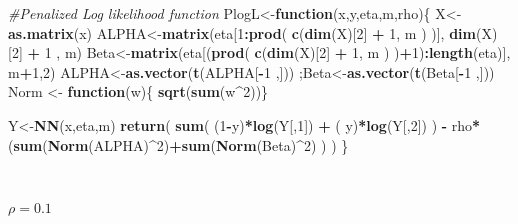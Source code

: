 \documentclass[]{article}
\newenvironment{Shaded}{\begin{snugshade}}{\end{snugshade}}
\newcommand{\KeywordTok}[1]{\textcolor[rgb]{0.13,0.29,0.53}{\textbf{#1}}}
\newcommand{\DecValTok}[1]{\textcolor[rgb]{0.00,0.00,0.81}{#1}}
\newcommand{\StringTok}[1]{\textcolor[rgb]{0.31,0.60,0.02}{#1}}
\newcommand{\CommentTok}[1]{\textcolor[rgb]{0.56,0.35,0.01}{\textit{#1}}}
\newcommand{\ControlFlowTok}[1]{\textcolor[rgb]{0.13,0.29,0.53}{\textbf{#1}}}
\newcommand{\OperatorTok}[1]{\textcolor[rgb]{0.81,0.36,0.00}{\textbf{#1}}}
\newcommand{\NormalTok}[1]{#1}
\begin{document}
\begin{Shaded}
\begin{Highlighting}[]
\CommentTok{#Penalized Log likelihood function}
\NormalTok{PlogL<-}\ControlFlowTok{function}\NormalTok{(x,y,eta,m,rho)\{}
\NormalTok{    X<-}\KeywordTok{as.matrix}\NormalTok{(x)}
\NormalTok{    ALPHA<-}\KeywordTok{matrix}\NormalTok{(eta[}\DecValTok{1}\OperatorTok{:}\KeywordTok{prod}\NormalTok{( }\KeywordTok{c}\NormalTok{(}\KeywordTok{dim}\NormalTok{(X)[}\DecValTok{2}\NormalTok{] }\OperatorTok{+}\StringTok{ }\DecValTok{1}\NormalTok{, m ) )], }\KeywordTok{dim}\NormalTok{(X)[}\DecValTok{2}\NormalTok{] }\OperatorTok{+}\StringTok{ }\DecValTok{1}\NormalTok{ , m)}
\NormalTok{    Beta<-}\KeywordTok{matrix}\NormalTok{(eta[(}\KeywordTok{prod}\NormalTok{( }\KeywordTok{c}\NormalTok{(}\KeywordTok{dim}\NormalTok{(X)[}\DecValTok{2}\NormalTok{] }\OperatorTok{+}\StringTok{ }\DecValTok{1}\NormalTok{, m ) )}\OperatorTok{+}\DecValTok{1}\NormalTok{)}\OperatorTok{:}\KeywordTok{length}\NormalTok{(eta)],}
\NormalTok{        m}\OperatorTok{+}\DecValTok{1}\NormalTok{,}\DecValTok{2}\NormalTok{)}
\NormalTok{    ALPHA<-}\KeywordTok{as.vector}\NormalTok{(}\KeywordTok{t}\NormalTok{(ALPHA[}\OperatorTok{-}\DecValTok{1}\NormalTok{ ,])) ;Beta<-}\KeywordTok{as.vector}\NormalTok{(}\KeywordTok{t}\NormalTok{(Beta[}\OperatorTok{-}\DecValTok{1}\NormalTok{ ,]))}
\NormalTok{  Norm <-}\StringTok{ }\ControlFlowTok{function}\NormalTok{(w)\{  }\KeywordTok{sqrt}\NormalTok{(}\KeywordTok{sum}\NormalTok{(w}\OperatorTok{^}\DecValTok{2}\NormalTok{))\}}

\NormalTok{    Y<-}\KeywordTok{NN}\NormalTok{(x,eta,m)}
    \KeywordTok{return}\NormalTok{( }\KeywordTok{sum}\NormalTok{( (}\DecValTok{1}\OperatorTok{-}\NormalTok{y)}\OperatorTok{*}\KeywordTok{log}\NormalTok{(Y[,}\DecValTok{1}\NormalTok{]) }\OperatorTok{+}\StringTok{ }\NormalTok{( y)}\OperatorTok{*}\KeywordTok{log}\NormalTok{(Y[,}\DecValTok{2}\NormalTok{])  ) }\OperatorTok{-}
\StringTok{        }\NormalTok{rho}\OperatorTok{*}\NormalTok{(}\KeywordTok{sum}\NormalTok{(}\KeywordTok{Norm}\NormalTok{(ALPHA)}\OperatorTok{^}\DecValTok{2}\NormalTok{)}\OperatorTok{+}\KeywordTok{sum}\NormalTok{(}\KeywordTok{Norm}\NormalTok{(Beta)}\OperatorTok{^}\DecValTok{2}\NormalTok{) )}
\NormalTok{    )   \}}
\end{Highlighting}
\end{Shaded}

~

\hfil {\Large $\rho = 0.1$}

~
\end{document}
